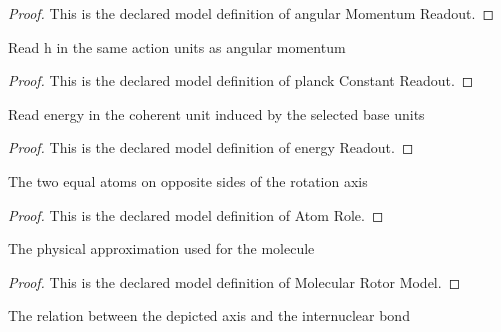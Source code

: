 \begin{proof}
  This is the declared model definition of angular Momentum Readout.
\end{proof}
\begin{definition}
  \label{def:physics:phyx-mini-0582:phyxminiproblems-problemphyxmini0582-planckconstantreadout}
  Read h in the same action units as angular momentum
\end{definition}
\begin{proof}
  This is the declared model definition of planck Constant Readout.
\end{proof}
\begin{definition}
  \label{def:physics:phyx-mini-0582:phyxminiproblems-problemphyxmini0582-energyreadout}
  Read energy in the coherent unit induced by the selected base units
\end{definition}
\begin{proof}
  This is the declared model definition of energy Readout.
\end{proof}
\begin{definition}
  \label{def:physics:phyx-mini-0582:phyxminiproblems-problemphyxmini0582-atomrole}
  The two equal atoms on opposite sides of the rotation axis
\end{definition}
\begin{proof}
  This is the declared model definition of Atom Role.
\end{proof}
\begin{definition}
  \label{def:physics:phyx-mini-0582:phyxminiproblems-problemphyxmini0582-molecularrotormodel}
  The physical approximation used for the molecule
\end{definition}
\begin{proof}
  This is the declared model definition of Molecular Rotor Model.
\end{proof}
\begin{definition}
  \label{def:physics:phyx-mini-0582:phyxminiproblems-problemphyxmini0582-axisgeometry}
  The relation between the depicted axis and the internuclear bond
\end{definition}
